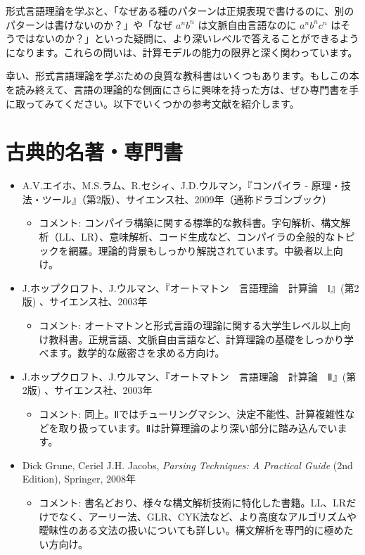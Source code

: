形式言語理論を学ぶと、「なぜある種のパターンは正規表現で書けるのに、別のパターンは書けないのか？」や「なぜ
\(a^n b^n\) は文脈自由言語なのに
\(a^n b^n c^n\)
はそうではないのか？」といった疑問に、より深いレベルで答えることができるようになります。これらの問いは、計算モデルの能力の限界と深く関わっています。

幸い、形式言語理論を学ぶための良質な教科書はいくつもあります。もしこの本を読み終えて、言語の理論的な側面にさらに興味を持った方は、ぜひ専門書を手に取ってみてください。以下でいくつかの参考文献を紹介します。

\hypertarget{chapter8-ux53e4ux5178ux7684ux540dux8457ux5c02ux9580ux66f8}{%
\section{古典的名著・専門書}\label{chapter8-ux53e4ux5178ux7684ux540dux8457ux5c02ux9580ux66f8}}

\begin{itemize}
\tightlist
\item
  A.V.エイホ、M.S.ラム、R.セシィ、J.D.ウルマン，『コンパイラ -
  原理・技法・ツール』（第2版）、サイエンス社、2009年（通称ドラゴンブック）

  \begin{itemize}
  \tightlist
  \item
    コメント:
    コンパイラ構築に関する標準的な教科書。字句解析、構文解析（LL、LR）、意味解析、コード生成など、コンパイラの全般的なトピックを網羅。理論的背景もしっかり解説されています。中級者以上向け。
  \end{itemize}
\item
  J.ホップクロフト、J.ウルマン、『オートマトン　言語理論　計算論　Ⅰ』(第2版)
  、サイエンス社、2003年

  \begin{itemize}
  \tightlist
  \item
    コメント:
    オートマトンと形式言語の理論に関する大学生レベル以上向け教科書。正規言語、文脈自由言語など、計算理論の基礎をしっかり学べます。数学的な厳密さを求める方向け。
  \end{itemize}
\item
  J.ホップクロフト、J.ウルマン、『オートマトン　言語理論　計算論　Ⅱ』(第2版)
  、サイエンス社、2003年

  \begin{itemize}
  \tightlist
  \item
    コメント:
    同上。Ⅱではチューリングマシン、決定不能性、計算複雑性などを取り扱っています。Ⅱは計算理論のより深い部分に踏み込んでいます。
  \end{itemize}
\item
  Dick Grune, Ceriel J.H. Jacobs, \emph{Parsing Techniques: A Practical
  Guide} (2nd Edition), Springer, 2008年

  \begin{itemize}
  \tightlist
  \item
    コメント:
    書名どおり、様々な構文解析技術に特化した書籍。LL、LRだけでなく、アーリー法、GLR、CYK法など、より高度なアルゴリズムや曖昧性のある文法の扱いについても詳しい。構文解析を専門的に極めたい方向け。
  \end{itemize}
\end{itemize}

